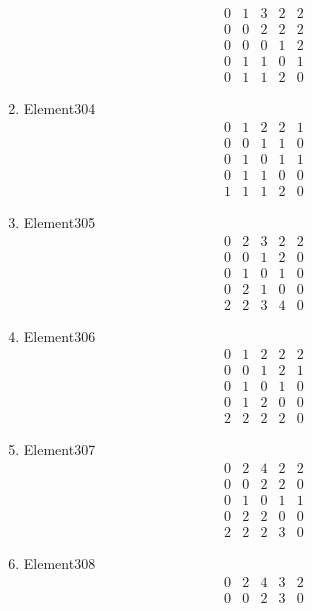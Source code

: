 \documentclass[12pt]{article}
\begin{document}
\begin{multicols}{3}
\begin{enumerate}
\begin{equation*}
\begin{array}{ccccc}
0&1&3&2&2\\
0&0&2&2&2\\
0&0&0&1&2\\
0&1&1&0&1\\
0&1&1&2&0
\end{array}
\end{equation*}
\item Element304
\begin{equation*}
\begin{array}{ccccc}
0&1&2&2&1\\
0&0&1&1&0\\
0&1&0&1&1\\
0&1&1&0&0\\
1&1&1&2&0
\end{array}
\end{equation*}
\item Element305
\begin{equation*}
\begin{array}{ccccc}
0&2&3&2&2\\
0&0&1&2&0\\
0&1&0&1&0\\
0&2&1&0&0\\
2&2&3&4&0
\end{array}
\end{equation*}
\item Element306
\begin{equation*}
\begin{array}{ccccc}
0&1&2&2&2\\
0&0&1&2&1\\
0&1&0&1&0\\
0&1&2&0&0\\
2&2&2&2&0
\end{array}
\end{equation*}
\item Element307
\begin{equation*}
\begin{array}{ccccc}
0&2&4&2&2\\
0&0&2&2&0\\
0&1&0&1&1\\
0&2&2&0&0\\
2&2&2&3&0
\end{array}
\end{equation*}
\item Element308
\begin{equation*}
\begin{array}{ccccc}
0&2&4&3&2\\
0&0&2&3&0\\

\end{array}
\end{equation*}
\end{enumerate}
\end{multicols}
\end{document}

